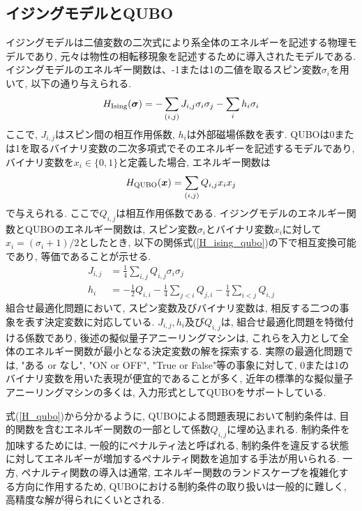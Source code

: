 \documentclass[submit,techrep,noauthor]{ipsj}
\begin{document}
\subsection{イジングモデルとQUBO}
イジングモデルは二値変数の二次式により系全体のエネルギーを記述する物理モデルであり, 元々は物性の相転移現象を記述するために導入されたモデルである. イジングモデルのエネルギー関数は、-1または1の二値を取るスピン変数$\sigma_{i}$を用いて, 以下の通り与えられる.
\begin{equation}
H_{\rm{Ising}}(\bm{\sigma}) = -\sum_{(i,j)} J_{i,j}\sigma_{i}\sigma_{j}
                    -\sum_{i} h_{i}\sigma_{i}
\label{H_ising}
\end{equation}
ここで, $J_{i,j}$はスピン間の相互作用係数, $h_{i}$は外部磁場係数を表す. QUBOは0または1を取るバイナリ変数の二次多項式でそのエネルギーを記述するモデルであり, バイナリ変数を$x_{i}\in\{0, 1\}$と定義した場合, エネルギー関数は
\begin{equation}
H_{\rm{QUBO}}(\bm{x}) = \sum_{(i,j)} Q_{i,j}x_{i}x_{j}
\label{H_qubo}
\end{equation}
で与えられる. ここで$Q_{i,j}$は相互作用係数である. イジングモデルのエネルギー関数とQUBOのエネルギー関数は, スピン変数$\sigma_{i}$とバイナリ変数$x_{i}$に対して$x_{i}=(\sigma_{i}+1)/2$としたとき, 以下の関係式(\ref{H_ising_qubo})の下で相互変換可能であり, 等価であることが示せる.
\begin{align}
J_{i,j} &= \frac{1}{4}\sum_{i,j}Q_{i,j}\sigma_{i}\sigma_{j}\nonumber\\
h_{i}  &= -\frac{1}{2}Q_{i,i}-\frac{1}{4}\sum_{j<i}Q_{j,i}-\frac{1}{4}\sum_{i<j}Q_{i,j}
\label{H_ising_qubo}
\end{align}
組合せ最適化問題において, スピン変数及びバイナリ変数は, 相反する二つの事象を表す決定変数に対応している.
$J_{i,j}, h_{i}$及び$Q_{i,j}$は, 組合せ最適化問題を特徴付ける係数であり, 後述の擬似量子アニーリングマシンは, これらを入力として全体のエネルギー関数が最小となる決定変数の解を探索する. 実際の最適化問題では, "ある or なし", "ON or OFF", "True or False"等の事象に対して, 0または1のバイナリ変数を用いた表現が便宜的であることが多く, 近年の標準的な擬似量子アニーリングマシンの多くは, 入力形式としてQUBOをサポートしている.

式(\ref{H_qubo})から分かるように, QUBOによる問題表現において制約条件は, 目的関数を含むエネルギー関数の一部として係数$Q_{i,j}$に埋め込まれる. 制約条件を加味するためには, 一般的にペナルティ法と呼ばれる, 制約条件を違反する状態に対してエネルギーが増加するペナルティ関数を追加する手法が用いられる. 一方, ペナルティ関数の導入は通常, エネルギー関数のランドスケープを複雑化する方向に作用するため, QUBOにおける制約条件の取り扱いは一般的に難しく, 高精度な解が得られにくいとされる.  
\end{document}
